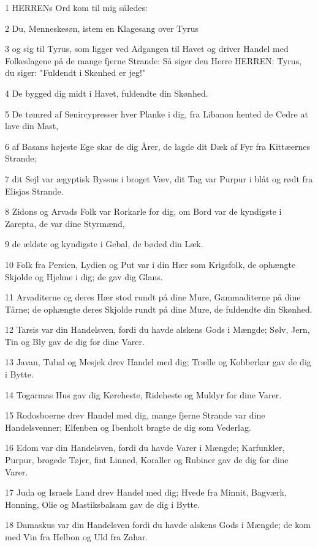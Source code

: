 \par 1 HERRENs Ord kom til mig således:
\par 2 Du, Menneskesøn, istem en Klagesang over Tyrus
\par 3 og sig til Tyrus, som ligger ved Adgangen til Havet og driver Handel med Folkeslagene på de mange fjerne Strande: Så siger den Herre HERREN: Tyrus, du siger: "Fuldendt i Skønhed er jeg!"
\par 4 De bygged dig midt i Havet, fuldendte din Skønhed.
\par 5 De tømred af Senircypresser hver Planke i dig, fra Libanon hented de Cedre at lave din Mast,
\par 6 af Basans højeste Ege skar de dig Årer, de lagde dit Dæk af Fyr fra Kittæernes Strande;
\par 7 dit Sejl var ægyptisk Byssus i broget Væv, dit Tag var Purpur i blåt og rødt fra Elisjas Strande.
\par 8 Zidons og Arvads Folk var Rorkarle for dig, om Bord var de kyndigste i Zarepta, de var dine Styrmænd,
\par 9 de ældste og kyndigste i Gebal, de bøded din Læk.
\par 10 Folk fra Persien, Lydien og Put var i din Hær som Krigsfolk, de ophængte Skjolde og Hjelme i dig; de gav dig Glans.
\par 11 Arvaditerne og deres Hær stod rundt på dine Mure, Gammaditerne på dine Tårne; de ophængte deres Skjolde rundt på dine Mure, de fuldendte din Skønhed.
\par 12 Tarsis var din Handelsven, fordi du havde alskens Gods i Mængde; Sølv, Jern, Tin og Bly gav de dig for dine Varer.
\par 13 Javan, Tubal og Mesjek drev Handel med dig; Trælle og Kobberkar gav de dig i Bytte.
\par 14 Togarmas Hus gav dig Køreheste, Rideheste og Muldyr for dine Varer.
\par 15 Rodosboerne drev Handel med dig, mange fjerne Strande var dine Handelsvenner; Elfenben og Ibenholt bragte de dig som Vederlag.
\par 16 Edom var din Handelsven, fordi du havde Varer i Mængde; Karfunkler, Purpur, brogede Tøjer, fint Linned, Koraller og Rubiner gav de dig for dine Varer.
\par 17 Juda og Israels Land drev Handel med dig; Hvede fra Minnit, Bagværk, Honning, Olie og Mastiksbalsam gav de dig i Bytte.
\par 18 Damaskus var din Handelsven fordi du havde alskens Gods i Mængde; de kom med Vin fra Helbon og Uld fra Zahar.
